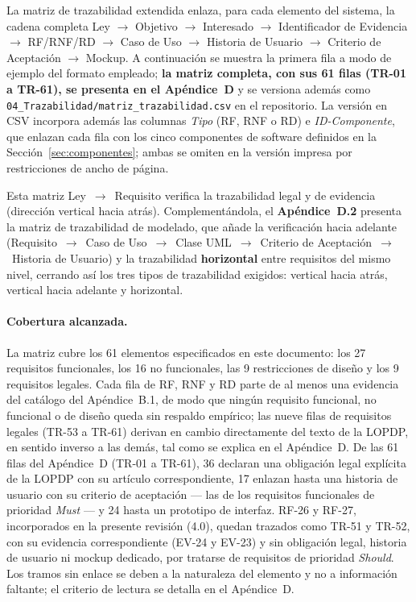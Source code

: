 \documentclass[journal,onecolumn]{IEEEtran}
\begin{document}
	La matriz de trazabilidad extendida enlaza, para cada elemento del sistema,
	la cadena completa Ley $\rightarrow$ Objetivo $\rightarrow$ Interesado
	$\rightarrow$ Identificador de Evidencia $\rightarrow$ RF/RNF/RD
	$\rightarrow$ Caso de Uso $\rightarrow$ Historia de Usuario
	$\rightarrow$ Criterio de Aceptación $\rightarrow$ Mockup. A continuación se
	muestra la primera fila a modo de ejemplo del formato empleado;
	\textbf{la matriz completa, con sus 61 filas (TR-01 a TR-61), se presenta en
		el Apéndice~D} y se versiona además como
	\texttt{04\_Trazabilidad/matriz\_trazabilidad.csv} en el repositorio. La
	versión en CSV incorpora además las columnas \emph{Tipo} (RF, RNF o RD) e
	\emph{ID-Componente}, que enlazan cada fila con los cinco componentes de
	software definidos en la Sección~\ref{sec:componentes}; ambas se omiten en la
	versión impresa por restricciones de ancho de página.

	Esta matriz Ley~$\rightarrow$~Requisito verifica la trazabilidad legal y
	de evidencia (dirección vertical hacia atrás). Complementándola, el
	\textbf{Apéndice~D.2} presenta la matriz de trazabilidad de modelado, que
	añade la verificación hacia adelante (Requisito~$\rightarrow$~Caso de
	Uso~$\rightarrow$~Clase UML~$\rightarrow$~Criterio de
	Aceptación~$\rightarrow$~Historia de Usuario) y la trazabilidad
	\textbf{horizontal} entre requisitos del mismo nivel, cerrando así los tres
	tipos de trazabilidad exigidos: vertical hacia atrás, vertical hacia
	adelante y horizontal.
	
	\paragraph{Cobertura alcanzada.}
	La matriz cubre los 61 elementos especificados en este documento: los 27
	requisitos funcionales, los 16 no funcionales, las 9 restricciones de
	diseño y los 9 requisitos legales. Cada fila de RF, RNF y RD parte de al
	menos una evidencia del catálogo del Apéndice~B.1, de modo que ningún
	requisito funcional, no funcional o de diseño queda sin respaldo empírico;
	las nueve filas de requisitos legales (TR-53 a TR-61) derivan en cambio
	directamente del texto de la LOPDP, en sentido inverso a las demás, tal
	como se explica en el Apéndice~D. De las 61 filas del Apéndice~D (TR-01 a
	TR-61), 36 declaran una obligación legal explícita de la LOPDP con su
	artículo correspondiente, 17 enlazan hasta una historia de usuario con su
	criterio de aceptación --- las de los requisitos funcionales de prioridad
	\emph{Must} --- y 24 hasta un prototipo de interfaz. RF-26 y RF-27,
	incorporados en la presente revisión (4.0), quedan trazados como TR-51 y
	TR-52, con su evidencia correspondiente (EV-24 y EV-23) y sin obligación
	legal, historia de usuario ni mockup dedicado, por tratarse de requisitos
	de prioridad \emph{Should}. Los tramos sin enlace se
	deben a la naturaleza del elemento y no a información faltante; el criterio
	de lectura se detalla en el Apéndice~D.
	
\end{document}
